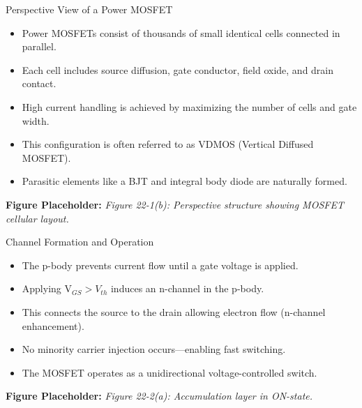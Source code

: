 \begin{frame}{Perspective View of a Power MOSFET}
\begin{itemize}
    \item Power MOSFETs consist of thousands of small identical cells connected in parallel.
    \item Each cell includes source diffusion, gate conductor, field oxide, and drain contact.
    \item High current handling is achieved by maximizing the number of cells and gate width.
    \item This configuration is often referred to as VDMOS (Vertical Diffused MOSFET).
    \item Parasitic elements like a BJT and integral body diode are naturally formed.
\end{itemize}

\vspace{0.5cm}
\textbf{Figure Placeholder:} \textit{Figure 22-1(b): Perspective structure showing MOSFET cellular layout.}
\end{frame}

\begin{frame}{Channel Formation and Operation}
\begin{itemize}
    \item The p-body prevents current flow until a gate voltage is applied.
    \item Applying V$_{GS} > V_{th}$ induces an n-channel in the p-body.
    \item This connects the source to the drain allowing electron flow (n-channel enhancement).
    \item No minority carrier injection occurs—enabling fast switching.
    \item The MOSFET operates as a unidirectional voltage-controlled switch.
\end{itemize}

\vspace{0.5cm}
\textbf{Figure Placeholder:} \textit{Figure 22-2(a): Accumulation layer in ON-state.}
\end{frame}


